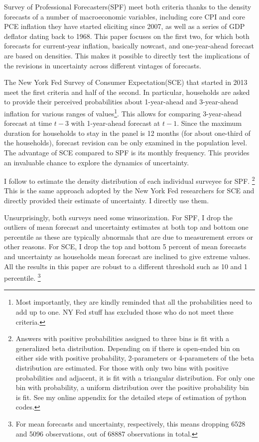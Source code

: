 \documentclass[12pt]{article}
\begin{document}
	Survey of Professional Forecasters(SPF) meet both criteria thanks to the density forecasts of a number of macroeconomic variables, including core CPI and core PCE inflation they have started eliciting since 2007, as well as a series of GDP deflator dating back to 1968. This paper focuses on the first two, for which both forecasts for current-year inflation, basically nowcast, and one-year-ahead forecast are based on densities. This makes it possible to directly test the implications of the revisions in uncertainty across different vintages of forecasts.   
	
	The New York Fed Survey of Consumer Expectation(SCE) that started in 2013 meet the first criteria and half of the second. In particular, households are asked to provide their perceived probabilities about 1-year-ahead and 3-year-ahead inflation for various ranges of values\footnote{Most importantly, they are kindly reminded that all the probabilities need to add up to one. NY Fed stuff has excluded those who do not meet these criteria.}. This allows for comparing 3-year-ahead forecast at time $t-3$ with 1-year-ahead forecast at $t-1$. Since the maximum duration for households to stay in the panel is 12 months (for about one-third of the households),  forecast revision can be only examined in the population level. The advantage of SCE compared to SPF is its monthly frequency. This provides an invaluable chance to explore the dynamics of uncertainty. 
	
	I follow \citet{engelberg2009comparing} to estimate the density distribution of each individual surveyee for SPF. \footnote{Answers with positive probabilities assigned to three bins is fit with a generalized beta distribution. Depending on if there is open-ended bin on either side with positive probability, 2-parameters or 4-parameters of the beta distribution are estimated. For those with only two bins with positive probabilities and adjacent, it is fit with a triangular distribution. For only one bin with probability, a uniform distribution over the positive probability bin is fit. See my online appendix for the detailed steps of estimation of python codes.} This is the same approach adopted by the New York Fed researchers \citet{armantier2017overview} for SCE and directly provided their estimate of uncertainty. I directly use them. 
	
	
	Unsurprisingly, both surveys need some winsorization. For SPF, I drop the outliers of mean forecast and uncertainty estimates at both top and bottom one percentile as these are typically abnormals that are due to measurement errors or other reasons.   For SCE, I drop the top and bottom 5 percent of mean forecasts and uncertainty as households mean forecast are inclined to give extreme values. All the results in this paper are robust to a different threshold such as 10 and 1 percentile. \footnote{For mean forecasts and uncertainty, respectively, this means dropping 6528 and 5096 observations, out of 68887 observations in total.}
	
\end{document}
